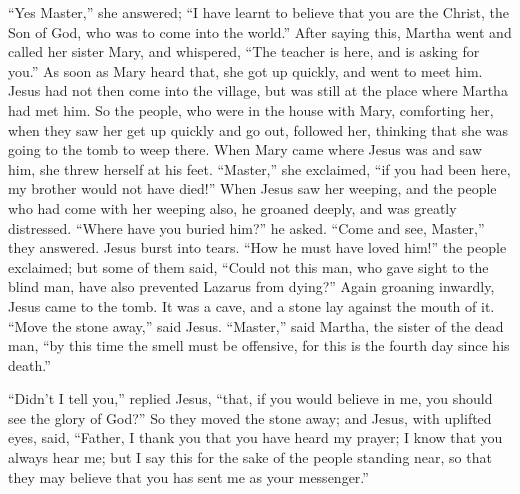  ``Yes Master,'' she answered; ``I have learnt to believe
that you are the Christ, the Son of God, who was to come into the
world.''  After saying this, Martha went and called her
sister Mary, and whispered, ``The teacher is here, and is asking for
you.''  As soon as Mary heard that, she got up quickly, and
went to meet him.  Jesus had not then come into the
village, but was still at the place where Martha had met him.
 So the people, who were in the house with Mary, comforting
her, when they saw her get up quickly and go out, followed her, thinking
that she was going to the tomb to weep there.  When Mary
came where Jesus was and saw him, she threw herself at his feet.
``Master,'' she exclaimed, ``if you had been here, my brother would not
have died!''  When Jesus saw her weeping, and the people
who had come with her weeping also, he groaned deeply, and was greatly
distressed.  ``Where have you buried him?'' he asked.
``Come and see, Master,'' they answered.  Jesus burst into
tears.  ``How he must have loved him!'' the people
exclaimed;  but some of them said, ``Could not this man,
who gave sight to the blind man, have also prevented Lazarus from
dying?''  Again groaning inwardly, Jesus came to the tomb.
It was a cave, and a stone lay against the mouth of it. 
``Move the stone away,'' said Jesus. ``Master,'' said Martha, the sister
of the dead man, ``by this time the smell must be offensive, for this is
the fourth day since his death.''

 ``Didn't I tell you,'' replied Jesus, ``that, if you would
believe in me, you should see the glory of God?''  So they
moved the stone away; and Jesus, with uplifted eyes, said, ``Father, I
thank you that you have heard my prayer;  I know that you
always hear me; but I say this for the sake of the people standing near,
so that they may believe that you has sent me as your messenger.''


